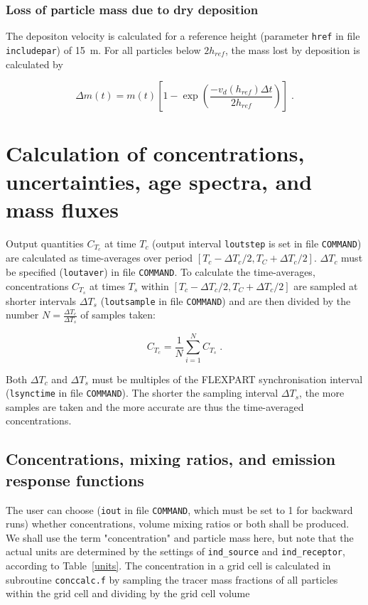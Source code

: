 \documentclass{egu}            %
\begin{document}
\subsubsection{Loss of particle mass due to dry deposition}

The depositon velocity is calculated for a reference height (parameter
\verb|href| in file \verb|includepar|) of 15~m.  For all particles below
$2h_{ref}$, the mass lost by deposition is calculated by

\begin{equation}
\Delta m(t)=m(t)\left[{1-\exp\left({\frac{-v_d(h_{ref})\Delta t}{2h_{ref}}}\right)}\right] \;.
\end{equation}

\section{\label{conccalc}Calculation of concentrations, uncertainties, age spectra, and mass fluxes}

Output quantities $C_{T_c}$ at time $T_c$ (output interval \verb|loutstep| is
set in file \verb|COMMAND|) are calculated as time-averages over period
$[T_c-\Delta T_c/2,T_C+\Delta T_c/2]$.  $\Delta T_c$ must be specified
(\verb|loutaver|) in file \verb|COMMAND|.  To calculate the time-averages,
concentrations $C_{T_s}$ at times $T_s$ within $[T_c-\Delta T_c/2,T_C+\Delta
T_c/2]$ are sampled at shorter intervals $\Delta T_s$ (\verb|loutsample| in
file \verb|COMMAND|) and are then divided by the number $N=\frac{\Delta
T_c}{\Delta T_s}$ of samples taken:

\begin{equation}
C_{T_c}= \frac{1}{N} \sum_{i=1}^N {C_{T_s}} \;.
\end{equation}

Both $\Delta T_c$ and $\Delta T_s$ must be multiples of the FLEXPART
synchronisation interval (\verb|lsynctime| in file \verb|COMMAND|).  The
shorter the sampling interval $\Delta T_s$, the more samples are taken and the
more accurate are thus the time-averaged concentrations.

\subsection{Concentrations, mixing ratios, and emission response functions}

The user can choose (\verb|iout| in file \verb|COMMAND|, which must be set to 1
for backward runs) whether concentrations, volume mixing ratios or both shall
be produced.  We shall use the term "concentration" and particle mass here, but
note that the actual units are determined by the settings of \verb|ind_source|
and \verb|ind_receptor|, according to Table~\ref{units}.  The concentration in
a grid cell is calculated in subroutine \verb|conccalc.f| by sampling the
tracer mass fractions of all particles within the grid cell and dividing by the
grid cell volume
\end{document}
